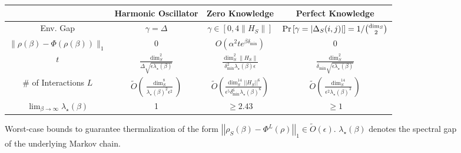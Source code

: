 \documentclass[11pt]{article}
\newcommand{\norm}[1]{\left|\left| #1 \right|\right|}
\newcommand{\bigotilde}[1]{\widetilde{O} \left( #1 \right)}
\begin{document}
\begin{figure}
    \begin{center}
        \begin{tabular}{|c | c| c | c |}
            \hline 
            & Harmonic Oscillator & Zero Knowledge & Perfect Knowledge \\
            \hline \hline 
            Env. Gap & $\gamma = \Delta$ & $\gamma \in [0, 4 \| H_S \| ]$ & ${\rm Pr} \left[\gamma = |\Delta_S(i,j)|\right] = 1 / \binom{\dim_S}{2}$ \\
            \hline 
            $\|\rho(\beta) - \Phi(\rho(\beta)) \|_1$ & 0 & $ O \left( \alpha^2 t e^{\beta \delta_{\min}} \right)$ & 0 \\
            \hline 
            $t$ & $\frac{\dim_S^2}{\Delta \sqrt{\epsilon \lambda_\star(\beta)} }$ & $\frac{\dim_S^2 \|H_S\| }{\delta_{\min}^2  \lambda_\star(\beta) \epsilon }$ & $\frac{\dim_S^2}{\delta_{\min} \sqrt{\epsilon \lambda_\star(\beta)} }$ \\
            \hline
            \# of Interactions $L$ & $\bigotilde{\frac{\dim_S^8}{ \lambda_\star(\beta)^2 \epsilon^2 }}$ & $\bigotilde{\frac{\dim_S^{14} \norm{H_S}^6}{\epsilon^5 \delta_{\min}^6 {\lambda}_\star(\beta)^{6} }}$ & $\bigotilde{\frac{\dim_S^{14}}{\epsilon^2 {\lambda}_\star(\beta)^3}}$  \\
            \hline
            $\lim_{\beta \to \infty} \lambda_\star(\beta)$ & 1 & $\ge 2.43$ & $\ge 1$ \\
            \hline
        \end{tabular}
    \end{center}
    \caption{Worst-case bounds to guarantee thermalization of the form $\norm{\rho_S(\beta) - \Phi^L(\rho)}_1 \in \bigotilde{\epsilon}$. $\lambda_\star(\beta)$ denotes the spectral gap of the underlying Markov chain.}
    \end{figure}
\end{document}
